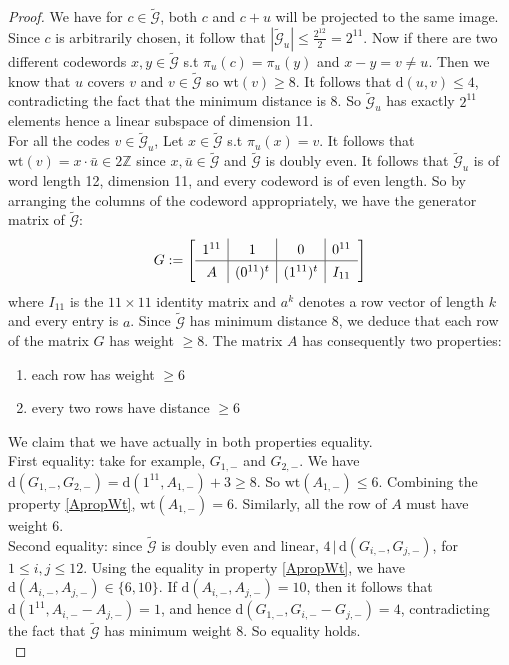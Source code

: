 \documentclass[12pt]{article}
\theoremstyle{definition}
\numberwithin{equation}{theorem}
\numberwithin{figure}{theorem}
\newcommand{\cCodes}{\ensuremath{\widetilde{\mathcal{G}}}}
\newcommand{\wt}[1]{\ensuremath{\text{wt}(#1)}}
\newcommand{\dist}[2]{\ensuremath{\text{d}(#1,#2)}}
\newcommand{\Integer}{\ensuremath{\mathbb{Z}}}
\begin{document}
\begin{proof}
We have for $c \in \cCodes$, both $c$ and $c + u$ will be projected to the same image. Since $c$ is arbitrarily chosen, it follow that $|\cCodes_u| \leq \frac{2^{12}}{2} = 2^{11}$. Now if there are two different codewords $x,y \in \cCodes$ s.t $\pi_{u}(c) = \pi_{u}(y)$ and $x - y = v \neq u$. Then we know that $u$ covers $v$ and $v \in \cCodes$ so $\wt{v} \geq 8$. It follows that $\dist{u}{v} \leq 4$, contradicting the fact that the minimum distance is 8. So $\cCodes_u$ has exactly $2^{11}$ elements hence a linear subspace of dimension 11.\\
For all the codes $v \in \cCodes_u$, Let $x \in \cCodes$ s.t $\pi_u(x) = v$. It follows that $\wt{v} = x \cdot \bar{u} \in 2\Integer$ since $x, \bar{u} \in \cCodes$ and $\cCodes$ is doubly even. It follows that $\cCodes_u$ is of word length 12, dimension 11, and every codeword is of even length.
So by arranging the columns of the codeword appropriately, we have the generator matrix of \cCodes:
\[
	G := 
\renewcommand\arraystretch{1.3}
\mleft[
\begin{array}{c|c|c|c}
  1^{11} & 1 & 0 & 0^{11} \\
  \hline
  A & (0^{11})^t & (1^{11})^t & I_{11}
\end{array}
\mright]
\]
where $I_{11}$ is the $11 \times 11$ identity matrix and $a^k$ denotes a row vector of length $k$ and every entry is $a$. Since {\cCodes} has minimum distance 8, we deduce that each row
of the matrix $G$ has weight $\geq 8$.
The matrix $A$ has consequently two properties:
\begin{enumerate}
	\item each row has weight $\geq 6$ \label{ApropWt}
	\item every two rows have distance $\geq 6$ \label{ArowDist}
\end{enumerate}
We claim that we have actually in both properties equality.\\
First equality: take for example, $G_{1,-}$ and $G_{2,-}$. We have $\dist{G_{1,-}}{G_{2,-}} = \dist{1^{11}}{A_{1,-}} + 3 \geq 8$. So $\wt{A_{1,-}} \leq 6$. Combining the property \ref{ApropWt}, $\wt{A_{1,-}} = 6$. Similarly, all the row of $A$ must have weight 6.\\
Second equality: since {\cCodes} is doubly even and linear, $4 \,|\, \dist{G_{i,-}}{G_{j,-}}$, for $1 \leq i,j \leq 12$. Using the equality in property \ref{ApropWt}, we have $\dist{A_{i,-}}{A_{j,-}} \in \{ 6, 10 \}$. If $\dist{A_{i,-}}{A_{j,-}} = 10$, then it follows that $\dist{1^{11}}{A_{i,-} - A_{j,-}} = 1$, and hence $\dist{G_{1,-}}{G_{i,-}- G_{j,-}} = 4$, contradicting the fact that {\cCodes} has minimum weight 8. So equality holds.\\

\end{proof}
\end{document}
